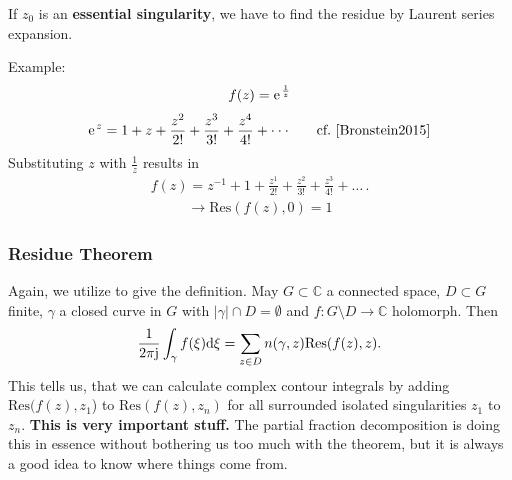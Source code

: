 \documentclass[11pt,a4paper,DIV=12]{scrartcl}
\begin{document}
\noindent If $z_0$ is an \textbf{essential singularity}, we have to find the residue by
Laurent series expansion.

\noindent Example:
\begin{align}
	f(z)=\e^{\frac{1}{z}} \nonumber
\end{align}
\begin{align}
	\e^z=1+z+\frac{z^2}{2!}+\frac{z^3}{3!}+\frac{z^4}{4!}+\cdot\cdot\cdot\quad\quad \textrm{cf.~\cite[Kap. 21, S. 1059]{Bronstein2015}} \nonumber
\end{align}
Substituting $z$ with $\frac{1}{z}$ results in
\begin{align}
	f(z)=z^{-1}+1+\frac{z^1}{2!}+\frac{z^2}{3!}+\frac{z^3}{4!}+\dots\,. \nonumber
\end{align}
\begin{align}
	\rightarrow\mathrm{Res}(f(z),0)=1 \nonumber
\end{align}
\subsubsection{Residue Theorem}
Again, we utilize \cite{Fritzsche2019} to give the definition.
May $G \subset \mathbb{C}$ a connected space, $D \subset G$ finite, $\gamma$ a closed curve in $G$ with $|\gamma| \cap D = \emptyset$ and $f: G \setminus D \rightarrow \mathbb{C}$ holomorph. Then
\begin{align}
	\frac{1}{2\pi\im}\int_{\gamma}f(\xi)\mathrm{d}\xi = \sum_{z\in D}n(\gamma,z)\mathrm{Res}(f(z),z).
\end{align}
This tells us, that we can calculate complex contour integrals
by adding $\mathrm{Res}(f(z),z_1$) to $\mathrm{Res}(f(z),z_n)$ for all
surrounded isolated singularities $z_1$ to $z_n$. \textbf{This is very important stuff.}
%
The partial fraction decomposition is doing this in essence without bothering
us too much with the theorem, but it is always a good idea to know where things
come from.
\end{document}
